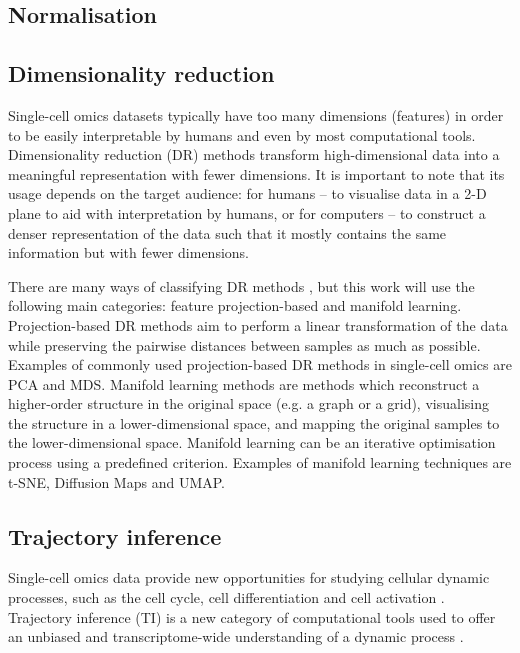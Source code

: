 
\subsection{Normalisation}

\subsection{Dimensionality reduction}
Single-cell omics datasets typically have too many dimensions (features) in order to be easily interpretable by humans and even by most computational tools. 
Dimensionality reduction (DR) methods transform high-dimensional data into a meaningful representation with fewer dimensions. It is important to note that its usage depends on the target audience: for humans -- to visualise data in a 2-D plane to aid with interpretation by humans, or for computers -- to construct a denser representation of the data such that it mostly contains the same information but with fewer dimensions.

There are many ways of classifying DR methods \cite{engel_surveydimensionreduction_2012}, but this work will use the following main categories: feature projection-based and manifold learning. 
Projection-based DR methods aim to perform a linear transformation of the data while preserving the pairwise distances between samples as much as possible. Examples of commonly used projection-based DR methods in single-cell omics are PCA and MDS. 
Manifold learning methods are methods which reconstruct a higher-order structure in the original space (e.g. a graph or a grid), visualising the structure in a lower-dimensional space, and mapping the original samples to the lower-dimensional space. Manifold learning can be an iterative optimisation process using a predefined criterion. Examples of manifold learning techniques are t-SNE, Diffusion Maps and UMAP. 

\subsection{Trajectory inference}
Single-cell omics data provide new opportunities for studying cellular dynamic processes, such as the cell cycle, cell differentiation and cell activation \cite{tanay_scalingsinglecellgenomics_2017,etzrodt_quantitativesinglecellapproaches_2014}. 
Trajectory inference (TI) is a new category of computational tools used to offer an unbiased and transcriptome-wide understanding of a dynamic process \cite{tanay_scalingsinglecellgenomics_2017,cannoodt_computationalmethodstrajectory_2016}. 

